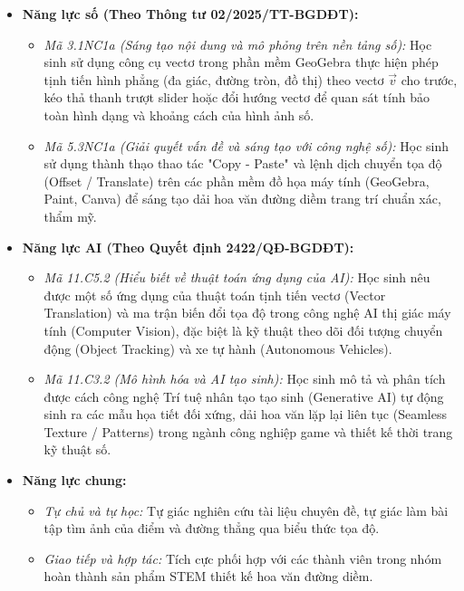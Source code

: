 \documentclass[12pt, a4paper]{article}
\renewcommand{\vec}[1]{\overrightarrow{#1}}
\begin{document}
\begin{itemize}[leftmargin=1.2cm]
    \item \textbf{Năng lực số (Theo Thông tư 02/2025/TT-BGDĐT):}  
    \begin{itemize}[leftmargin=0.6cm]  
        \item \textit{Mã 3.1NC1a (Sáng tạo nội dung và mô phỏng trên nền tảng số):} Học sinh sử dụng công cụ vectơ trong phần mềm GeoGebra thực hiện phép tịnh tiến hình phẳng (đa giác, đường tròn, đồ thị) theo vectơ $\vec{v}$ cho trước, kéo thả thanh trượt slider hoặc đổi hướng vectơ để quan sát tính bảo toàn hình dạng và khoảng cách của hình ảnh số.  
        \item \textit{Mã 5.3NC1a (Giải quyết vấn đề và sáng tạo với công nghệ số):} Học sinh sử dụng thành thạo thao tác "Copy - Paste" và lệnh dịch chuyển tọa độ (Offset / Translate) trên các phần mềm đồ họa máy tính (GeoGebra, Paint, Canva) để sáng tạo dải hoa văn đường diềm trang trí chuẩn xác, thẩm mỹ.  
    \end{itemize}  
  
    \item \textbf{Năng lực AI (Theo Quyết định 2422/QĐ-BGDĐT):}  
    \begin{itemize}[leftmargin=0.6cm]  
        \item \textit{Mã 11.C5.2 (Hiểu biết về thuật toán ứng dụng của AI):} Học sinh nêu được một số ứng dụng của thuật toán tịnh tiến vectơ (Vector Translation) và ma trận biến đổi tọa độ trong công nghệ AI thị giác máy tính (Computer Vision), đặc biệt là kỹ thuật theo dõi đối tượng chuyển động (Object Tracking) và xe tự hành (Autonomous Vehicles).  
        \item \textit{Mã 11.C3.2 (Mô hình hóa và AI tạo sinh):} Học sinh mô tả và phân tích được cách công nghệ Trí tuệ nhân tạo tạo sinh (Generative AI) tự động sinh ra các mẫu họa tiết đối xứng, dải hoa văn lặp lại liên tục (Seamless Texture / Patterns) trong ngành công nghiệp game và thiết kế thời trang kỹ thuật số.  
    \end{itemize}  
  
    \item \textbf{Năng lực chung:}  
    \begin{itemize}[leftmargin=0.6cm]  
        \item \textit{Tự chủ và tự học:} Tự giác nghiên cứu tài liệu chuyên đề, tự giác làm bài tập tìm ảnh của điểm và đường thẳng qua biểu thức tọa độ.  
        \item \textit{Giao tiếp và hợp tác:} Tích cực phối hợp với các thành viên trong nhóm hoàn thành sản phẩm STEM thiết kế hoa văn đường diềm.  
    \end{itemize}  
\end{itemize}  
  
\end{document}
